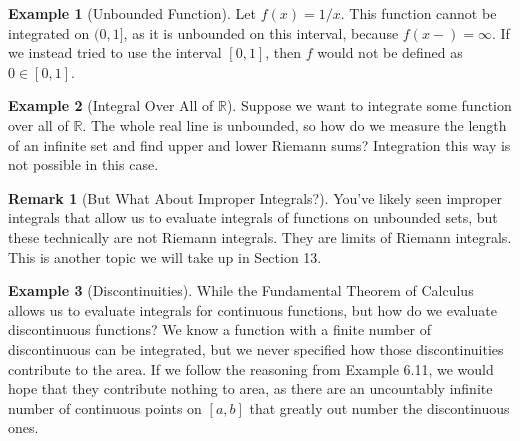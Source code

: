 \documentclass{article}
\newcommand{\R}{\mathbb{R}}
\theoremstyle{definition}
\newtheorem{example}{Example}[section]
\newtheorem{remark}{Remark}[section]
\begin{document}
\begin{example}[Unbounded Function]
	Let $ f(x)=1/x $. This function cannot be integrated on $ (0,1] $, as it is unbounded on this interval, because $ f(x-)=\infty $. If we instead tried to use the interval $ [0,1] $, then $ f $ would not be defined as $ 0\in[0,1] $.  
\end{example}
\begin{example}[Integral Over All of $ \R $]
	Suppose we want to integrate some function over all of $ \R $. The whole real line is unbounded, so how do we measure the length of an infinite set and find upper and lower Riemann sums? Integration this way is not possible in this case. 
\end{example}
\begin{remark}[But What About Improper Integrals?]
	You've likely seen improper integrals that allow us to evaluate integrals of functions on unbounded sets, but these technically are not Riemann integrals. They are limits of Riemann integrals. This is another topic we will take up in Section 13. 
\end{remark}
\begin{example}[Discontinuities]
While the Fundamental Theorem of Calculus allows us to evaluate integrals for continuous functions, but how do we evaluate discontinuous functions? We know a function with a finite number of discontinuous can be integrated, but we never specified how those discontinuities contribute to the area. If we follow the reasoning from Example 6.11, we would hope that they contribute nothing to area, as there are an uncountably infinite number of continuous points on $ [a,b] $ that greatly out number the discontinuous ones. 
\end{example}


\newpage
\end{document}
